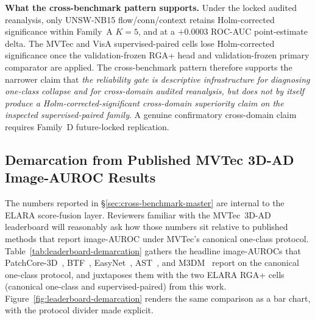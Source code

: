 \documentclass[10pt,conference]{IEEEtran}
\newcommand{\system}{ELARA}
\begin{document}
\noindent\textbf{What the cross-benchmark pattern supports.} Under
the locked audited reanalysis, only UNSW-NB15 flow/conn/context
retains Holm-corrected significance within Family~A $K{=}5$, and at
a $+0.0003$ ROC-AUC point-estimate delta. The MVTec and VisA
supervised-paired cells lose Holm-corrected significance once the
validation-frozen RGA+ head and validation-frozen primary comparator
are applied. The cross-benchmark pattern therefore supports the
narrower claim that \emph{the reliability gate is descriptive
infrastructure for diagnosing one-class collapse and for cross-domain
audited reanalysis, but does not by itself produce a
Holm-corrected-significant cross-domain superiority claim on the
inspected supervised-paired family}. A genuine confirmatory
cross-domain claim requires Family~D future-locked replication.

\subsection{Demarcation from Published MVTec 3D-AD Image-AUROC Results}
\label{sec:leaderboard-demarcation}

The numbers reported in §\ref{sec:cross-benchmark-master} are internal
to the \system{} score-fusion layer. Reviewers familiar with the
MVTec~3D-AD leaderboard will reasonably ask how those numbers sit
relative to published methods that report image-AUROC under MVTec's
canonical one-class protocol.
Table~\ref{tab:leaderboard-demarcation} gathers the headline image-AUROCs that
PatchCore-3D~\cite{roth2022patchcore},
BTF~\cite{horwitz2023btf},
EasyNet~\cite{chen2023easynet},
AST~\cite{rudolph2023ast}, and
M3DM~\cite{wang2023m3dm} report on the canonical one-class protocol,
and juxtaposes them with the two \system{} RGA+ cells (canonical
one-class and supervised-paired) from this work.
Figure~\ref{fig:leaderboard-demarcation} renders the same comparison as a
bar chart, with the protocol divider made explicit.

\end{document}

